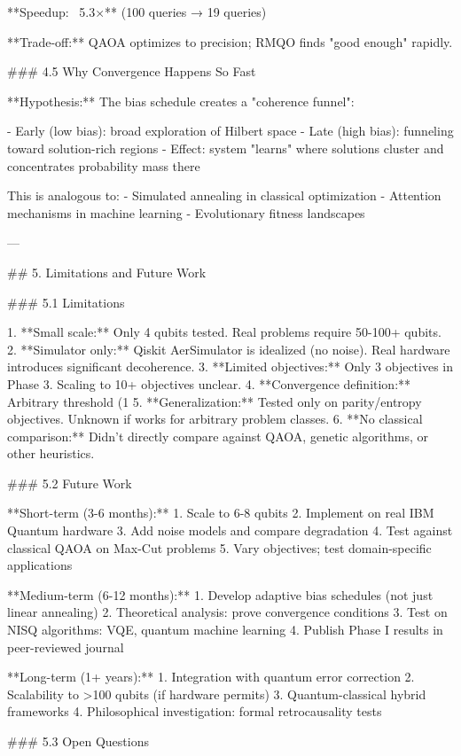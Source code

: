 **Speedup: ~5.3×** (100 queries → 19 queries)

**Trade-off:** QAOA optimizes to precision; RMQO finds "good enough" rapidly.

### 4.5 Why Convergence Happens So Fast

**Hypothesis:** The bias schedule creates a "coherence funnel":

- Early (low bias): broad exploration of Hilbert space
- Late (high bias): funneling toward solution-rich regions
- Effect: system "learns" where solutions cluster and concentrates probability mass there

This is analogous to:
- Simulated annealing in classical optimization
- Attention mechanisms in machine learning
- Evolutionary fitness landscapes

---

## 5. Limitations and Future Work

### 5.1 Limitations

1. **Small scale:** Only 4 qubits tested. Real problems require 50-100+ qubits.
2. **Simulator only:** Qiskit AerSimulator is idealized (no noise). Real hardware introduces significant decoherence.
3. **Limited objectives:** Only 3 objectives in Phase 3. Scaling to 10+ objectives unclear.
4. **Convergence definition:** Arbitrary threshold (1%
5. **Generalization:** Tested only on parity/entropy objectives. Unknown if works for arbitrary problem classes.
6. **No classical comparison:** Didn't directly compare against QAOA, genetic algorithms, or other heuristics.

### 5.2 Future Work

**Short-term (3-6 months):**
1. Scale to 6-8 qubits
2. Implement on real IBM Quantum hardware
3. Add noise models and compare degradation
4. Test against classical QAOA on Max-Cut problems
5. Vary objectives; test domain-specific applications

**Medium-term (6-12 months):**
1. Develop adaptive bias schedules (not just linear annealing)
2. Theoretical analysis: prove convergence conditions
3. Test on NISQ algorithms: VQE, quantum machine learning
4. Publish Phase I results in peer-reviewed journal

**Long-term (1+ years):**
1. Integration with quantum error correction
2. Scalability to >100 qubits (if hardware permits)
3. Quantum-classical hybrid frameworks
4. Philosophical investigation: formal retrocausality tests

### 5.3 Open Questions

